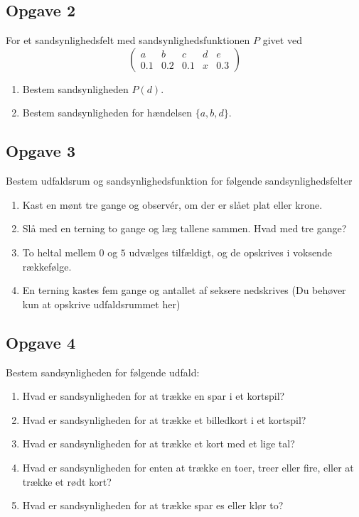 \subsection*{Opgave 2}
For et sandsynlighedsfelt med sandsynlighedsfunktionen $P$ givet ved
$$
	\begin{pmatrix}
		a & b & c & d & e \\
		0.1 & 0.2 & 0.1 & x & 0.3 
	\end{pmatrix}
$$
\begin{enumerate}[label=\roman*)]
	\item Bestem sandsynligheden $P(d)$. 
	\item Bestem sandsynligheden for hændelsen $\{a,b,d\}$. 
\end{enumerate}

\subsection*{Opgave 3}
Bestem udfaldsrum og sandsynlighedsfunktion for følgende sandsynlighedsfelter
\begin{enumerate}[label=\roman*)]
\item Kast en mønt tre gange og observér, om der er slået plat eller krone. 
\item Slå med en terning to gange og læg tallene sammen. Hvad med tre gange?
\item To heltal mellem $0$ og $5$ udvælges tilfældigt, og de opskrives i voksende rækkefølge.
\item En terning kastes fem gange og antallet af seksere nedskrives (Du behøver kun at opskrive udfaldsrummet her)
\end{enumerate}

\subsection*{Opgave 4}
Bestem sandsynligheden for følgende udfald:
\begin{enumerate}[label=\roman*)]
	\item Hvad er sandsynligheden for at trække en spar i et kortspil?
	\item Hvad er sandsynligheden for at trække et billedkort i et kortspil?
	\item Hvad er sandsynligheden for at trække et kort med et lige tal?
	\item Hvad er sandsynligheden for enten at trække en toer, treer eller fire, eller at trække et rødt kort?
	\item Hvad er sandsynligheden for at trække spar es eller klør to?
\end{enumerate}


